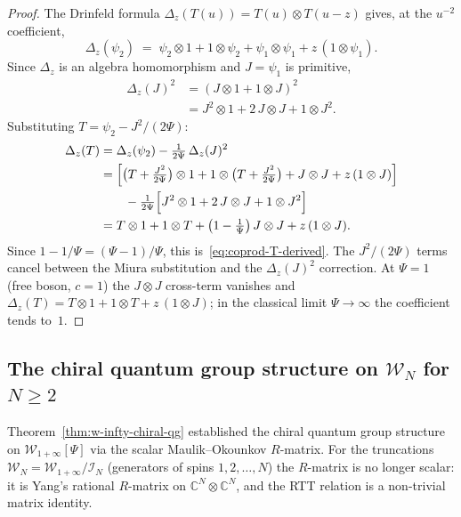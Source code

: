 \documentclass[11pt,reqno]{amsart}
\theoremstyle{definition}
\theoremstyle{remark}
\newcommand{\cW}{\mathcal{W}}
\newcommand{\CC}{\mathbb{C}}
\numberwithin{equation}{section}
\begin{document}
\begin{proof}
The Drinfeld formula
$\Delta_z(T(u)) = T(u) \otimes T(u-z)$
gives, at the $u^{-2}$ coefficient,
\[
  \Delta_z(\psi_2)
  \;=\;
  \psi_2 \otimes 1
  + 1 \otimes \psi_2
  + \psi_1 \otimes \psi_1
  + z\,(1 \otimes \psi_1).
\]
Since $\Delta_z$ is an algebra homomorphism and
$J = \psi_1$ is primitive,
\begin{align*}
  \Delta_z(J)^2
  &= (J \otimes 1 + 1 \otimes J)^2 \\
  &= J^2 \otimes 1
  + 2\,J \otimes J
  + 1 \otimes J^2.
\end{align*}
Substituting $T = \psi_2 - J^2/(2\Psi)$:
\begin{align*}
  \Delta_z(T)
  &= \Delta_z(\psi_2)
  - \tfrac{1}{2\Psi}\,\Delta_z(J)^2 \\
  &= \Bigl[
    \bigl(T + \tfrac{J^2}{2\Psi}\bigr) \otimes 1
    + 1 \otimes \bigl(T + \tfrac{J^2}{2\Psi}\bigr)
    + J \otimes J
    + z\,(1 \otimes J)
  \Bigr] \\
  &\qquad
  - \tfrac{1}{2\Psi}\Bigl[
    J^2 \otimes 1
    + 2\,J \otimes J
    + 1 \otimes J^2
  \Bigr] \\
  &= T \otimes 1
  + 1 \otimes T
  + \bigl(1 - \tfrac{1}{\Psi}\bigr)\,
  J \otimes J
  + z\,(1 \otimes J).
\end{align*}
Since $1 - 1/\Psi = (\Psi - 1)/\Psi$, this
is~\eqref{eq:coprod-T-derived}. The
$J^2/(2\Psi)$ terms cancel between the Miura
substitution and the $\Delta_z(J)^2$ correction.
At $\Psi = 1$ (free boson, $c = 1$) the
$J \otimes J$ cross-term vanishes and
$\Delta_z(T) = T \otimes 1 + 1 \otimes T
+ z\,(1 \otimes J)$;
in the classical limit $\Psi \to \infty$ the
coefficient tends to~$1$.
\end{proof}


\subsection{The chiral quantum group structure on
$\cW_N$ for $N \geq 2$}
\label{subsec:glN-chiral-qg}

Theorem~\ref{thm:w-infty-chiral-qg} established the chiral
quantum group structure on $\cW_{1+\infty}[\Psi]$ via the
scalar Maulik--Okounkov $R$-matrix. For the truncations
$\cW_N = \cW_{1+\infty}/\mathcal{I}_N$ (generators of spins
$1, 2, \ldots, N$) the $R$-matrix is no longer scalar: it
is Yang's rational $R$-matrix on $\CC^N \otimes \CC^N$,
and the RTT relation is a non-trivial matrix identity.
\end{document}

